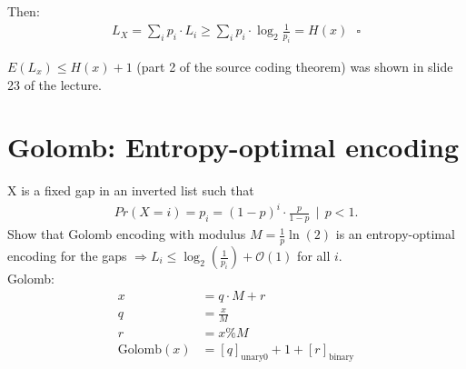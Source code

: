 \documentclass[12pt]{article}%
\begin{document}
\begin{comment}
Now we have:\\
\begin{align}
\sum_{i} 2^{-L_{i}} - 1 &\leq 0\\
i \cdot 2^{-L_{i}} - 1 &\leq 0\\
2^{-L_{i}} = \frac{p_{i}}{-\log(2) \lambda} &\leq \frac{1}{i}\\
L_{i} = -\log_{2}(\frac{p_{i}}{-\log(2) \lambda}) &\leq -\log_{2}(\frac{1}{i})
\end{align}

$\Rightarrow$ Minimal for $L_{i} = \log_{2}\frac{1}{p_{i}}$\\

\end{comment}

Then:
\begin{align}
L_{X} = \sum_{i} p_{i} \cdot L_{i} \geq \sum_{i} p_{i} \cdot \log_{2} \frac{1}{p_{i}} = H(x) \: \: \: \square
\end{align}

$E(L_{x}) \leq H(x) + 1$ (part 2 of the source coding theorem) was shown in slide 23 of the lecture.

\section{Golomb: Entropy-optimal encoding}
X is a fixed gap in an inverted list such that
\begin{align}
Pr(X = i) = p_{i} = (1 - p)^{i} \cdot \frac{p}{1 - p} \: \: | \: \: p < 1.
\end{align}
Show that Golomb encoding with modulus $M = \frac{1}{p}\ln(2)$ is an entropy-optimal encoding for the gaps $\Rightarrow L_{i} \leq \log_{2}(\frac{1}{p_{i}}) + \mathcal{O}(1)$ for all $i$.\\

Golomb:
\begin{align}
x &= q \cdot M + r\\
q &= \frac{x}{M}\\
r &= x \% M\\
\text{Golomb}(x) &= [q]_{\text{unary}0} + 1 + [r]_{\text{binary}}
\end{align}
\end{document}
